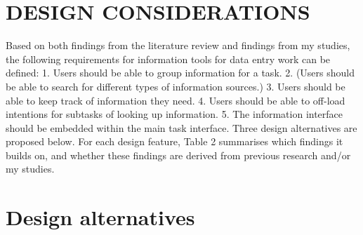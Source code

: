 \section{DESIGN CONSIDERATIONS}
Based on both findings from the literature review and findings from my studies, the following requirements for information tools for data entry work can be defined:
1.	Users should be able to group information for a task.
2.	(Users should be able to search for different types of information sources.)
3.	Users should be able to keep track of information they need.
4.	Users should be able to off-load intentions for subtasks of looking up information.
5.	The information interface should be embedded within the main task interface. 
Three design alternatives are proposed below. For each design feature, Table 2 summarises which findings it builds on, and whether these findings are derived from previous research and/or my studies.





\section{Design alternatives}